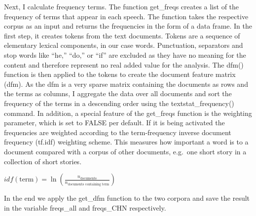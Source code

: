 \documentclass[
]{article}
\begin{document}
Next, I calculate frequency terms. The function get\_freqs creates a
list of the frequency of terms that appear in each speech. The function
takes the respective corpus as an input and returns the frequencies in
the form of a data frame. In the ﬁrst step, it creates tokens from the
text documents. Tokens are a sequence of elementary lexical components,
in our case words. Punctuation, separators and stop words like ``he,''
``do,'' or ``if'' are excluded as they have no meaning for the content
and therefore represent no real added value for the analysis. The dfm()
function is then applied to the tokens to create the document feature
matrix (dfm). As the dfm is a very sparse matrix containing the
documents as rows and the terms as columns, I aggregate the data over
all documents and sort the frequency of the terms in a descending order
using the textstat\_frequency() command. In addition, a special feature
of the get\_freqs function is the weighting parameter, which is set to
FALSE per default. If it is being activated the frequencies are weighted
according to the term-frequency inverse document frequency (tf.idf)
weighting scheme. This measures how important a word is to a document
compared with a corpus of other documents, e.g.~one short story in a
collection of short stories.

\(idf(\text{term}) = \ln{\left(\frac{n_{\text{documents}}}{n_{\text{documents containing term}}}\right)}\)

In the end we apply the get\_dfm function to the two corpora and save
the result in the variable freqs\_all and freqs\_CHN respectively.
\end{document}

